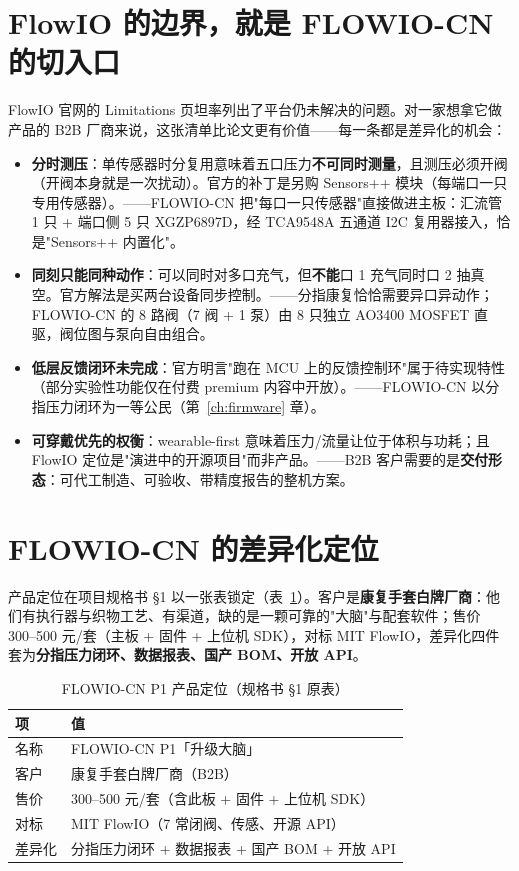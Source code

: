 \section{FlowIO 的边界，就是 FLOWIO-CN 的切入口}
\label{sec:intro-limits}

FlowIO 官网的 Limitations 页坦率列出了平台仍未解决的问题。对一家想拿它做产品的 B2B 厂商来说，这张清单比论文更有价值——每一条都是差异化的机会：

\begin{itemize}
  \item \textbf{分时测压}：单传感器时分复用意味着五口压力\textbf{不可同时测量}，且测压必须开阀（开阀本身就是一次扰动）。官方的补丁是另购 Sensors++ 模块（每端口一只专用传感器）。——FLOWIO-CN 把"每口一只传感器"直接做进主板：汇流管 1 只 + 端口侧 5 只 XGZP6897D，经 TCA9548A 五通道 I2C 复用器接入，恰是"Sensors++ 内置化"。
  \item \textbf{同刻只能同种动作}：可以同时对多口充气，但\textbf{不能}口 1 充气同时口 2 抽真空。官方解法是买两台设备同步控制。——分指康复恰恰需要异口异动作；FLOWIO-CN 的 8 路阀（7 阀 + 1 泵）由 8 只独立 AO3400 MOSFET 直驱，阀位图与泵向自由组合。
  \item \textbf{低层反馈闭环未完成}：官方明言"跑在 MCU 上的反馈控制环"属于待实现特性（部分实验性功能仅在付费 premium 内容中开放）。——FLOWIO-CN 以分指压力闭环为一等公民（第~\ref{ch:firmware} 章）。
  \item \textbf{可穿戴优先的权衡}：wearable-first 意味着压力/流量让位于体积与功耗；且 FlowIO 定位是"演进中的开源项目"而非产品。——B2B 客户需要的是\textbf{交付形态}：可代工制造、可验收、带精度报告的整机方案。
\end{itemize}

\section{FLOWIO-CN 的差异化定位}
\label{sec:intro-position}

产品定位在项目规格书 \S1 以一张表锁定（表~\ref{tab:intro-spec}）。客户是\textbf{康复手套白牌厂商}：他们有执行器与织物工艺、有渠道，缺的是一颗可靠的"大脑"与配套软件；售价 300--500 元/套（主板 + 固件 + 上位机 SDK），对标 MIT FlowIO，差异化四件套为\textbf{分指压力闭环、数据报表、国产 BOM、开放 API}。

\begin{table}[htbp]
  \centering
  \caption{FLOWIO-CN P1 产品定位（规格书 \S1 原表）}
  \label{tab:intro-spec}
  \begin{tabular}{ll}
    \toprule
    项 & 值 \\
    \midrule
    名称 & FLOWIO-CN P1「升级大脑」 \\
    客户 & 康复手套白牌厂商（B2B） \\
    售价 & 300--500 元/套（含此板 + 固件 + 上位机 SDK） \\
    对标 & MIT FlowIO（7 常闭阀、传感、开源 API） \\
    差异化 & 分指压力闭环 + 数据报表 + 国产 BOM + 开放 API \\
    \bottomrule
  \end{tabular}
\end{table}

